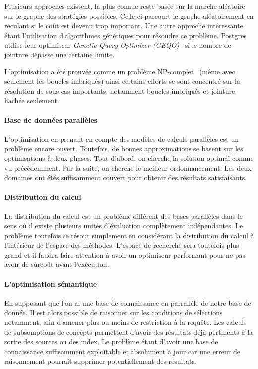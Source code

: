 Plusieurs approches existent, la plus connue reste basée sur la marche aléatoire sur le graphe des stratégies possibles. Celle-ci parcourt le graphe aléatoirement en reculant si le coût est devenu trop important. Une autre approche intéressante étant l'utilisation d'algorithmes génétiques pour résoudre ce problème. Postgres utilise leur optimiseur \textit{Genetic Query Optimizer (GEQO)}~\cite{Postgres:geqo} si le nombre de jointure dépasse une certaine limite.

L'optimisation a été prouvée comme un problème NP-complet~\cite{Ibaraki:join} (même avec seulement les boucles imbriqués) ainsi certains efforts se sont concentré sur la résolution de sous cas importants, notamment boucles imbriqués et jointure hachée seulement.

\paragraph*{Base de données parallèles}
L'optimisation en prenant en compte des modèles de calculs parallèles est un problème encore ouvert. Toutefois. de bonnes approximations se basent sur les optimisations à deux phases. Tout d'abord, on cherche la solution optimal comme vu précédemment. Par la suite, on cherche le meilleur ordonnancement. Les deux domaines ont étés suffisamment couvert pour obtenir des résultats satisfaisants.

\paragraph*{Distribution du calcul}
La distribution du calcul est un problème différent des bases parallèles dans le sens où il existe plusieurs unités d'évaluation complètement indépendantes. Le problème toutefois se résout simplement en considérant la distribution du calcul à l'intérieur de l'espace des méthodes. L'espace de recherche sera toutefois plus grand et il faudra faire attention à avoir un optimiseur performant pour ne pas avoir de surcoût avant l'exécution.

\paragraph*{L'optimisation sémantique}
En supposant que l'on ai une base de connaissance en parrallèle de notre base de donnée. Il est alors possible de raisonner sur les conditions de sélections notamment, afin d'amener plus ou moins de restriction à la requête. Les calculs de subsomptions de concepts permettent d'avoir des résultats déjà pertinents à la sortie des sources ou des index. Le problème étant d'avoir une base de connaissance suffisamment exploitable et absolument à jour car une erreur de raisonnement pourrait supprimer potentiellement des résultats.

